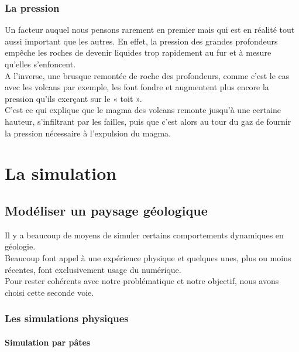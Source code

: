 \documentclass[a4paper,11pt]{article}
\begin{document}
\subsubsection{La pression}

Un facteur auquel nous pensons rarement en premier mais qui est en réalité tout aussi important que les autres.
En effet, la pression des grandes profondeurs empêche les roches de devenir liquides trop rapidement au fur et à mesure qu'elles s'enfoncent.\\
A l'inverse, une brusque remontée de roche des profondeurs, comme c'est le cas avec les volcans par exemple, les font fondre et augmentent plus encore la pression qu'ils exerçant sur le « toit ».\\
C'est ce qui explique que le magma des volcans remonte jusqu'à une certaine hauteur, s'infiltrant par les failles, puis que c'est alors au tour du gaz de fournir la pression nécessaire à l'expulsion du magma.

\section{La simulation}

\subsection{Modéliser un paysage géologique}

Il y a beaucoup de moyens de simuler certains comportements dynamiques en géologie.\\
Beaucoup font appel à une expérience physique et quelques unes, plus ou moins récentes, font exclusivement usage du numérique.\\
Pour rester cohérents avec notre problématique et notre objectif, nous avons choisi cette seconde voie.

\subsubsection{Les simulations physiques}

\paragraph{Simulation par pâtes}
\end{document}
